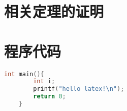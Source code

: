 
\begin{appendices}

\section{相关定理的证明}

\zhlipsum*[2]

\section{程序代码}


\begin{lstlisting}[language=C++,title={\raggedright 基础程序}]
    int main(){
        int i;
        printf("hello latex!\n");
        return 0;
    }
\end{lstlisting}






\end{appendices}
